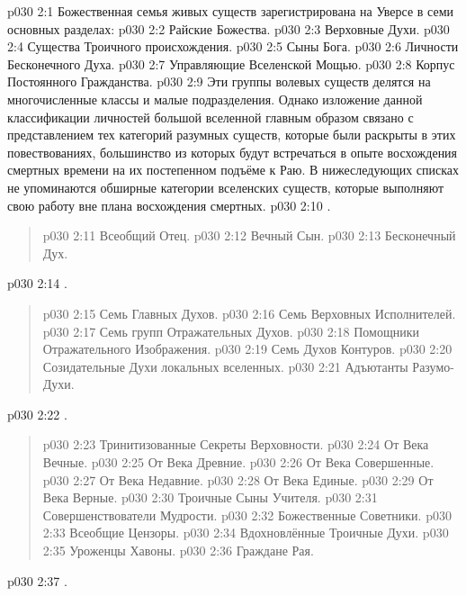 \vs p030 2:1 Божественная семья живых существ зарегистрирована на Уверсе в семи основных разделах:
\vs p030 2:2 Райские Божества.
\vs p030 2:3 Верховные Духи.
\vs p030 2:4 Существа Троичного происхождения.
\vs p030 2:5 Сыны Бога.
\vs p030 2:6 Личности Бесконечного Духа.
\vs p030 2:7 Управляющие Вселенской Мощью.
\vs p030 2:8 Корпус Постоянного Гражданства.
\vs p030 2:9 \pc Эти группы волевых существ делятся на многочисленные классы и малые подразделения. Однако изложение данной классификации личностей большой вселенной главным образом связано с представлением тех категорий разумных существ, которые были раскрыты в этих повествованиях, большинство из которых будут встречаться в опыте восхождения смертных времени на их постепенном подъёме к Раю. В нижеследующих списках не упоминаются обширные категории вселенских существ, которые выполняют свою работу вне плана восхождения смертных.
\vs p030 2:10 .
\begin{quote}
\vs p030 2:11 Всеобщий Отец.
\vs p030 2:12 Вечный Сын.
\vs p030 2:13 Бесконечный Дух.
\end{quote}
\vs p030 2:14 .
\begin{quote}
\vs p030 2:15 Семь Главных Духов.
\vs p030 2:16 Семь Верховных Исполнителей.
\vs p030 2:17 Семь групп Отражательных Духов.
\vs p030 2:18 Помощники Отражательного Изображения.
\vs p030 2:19 Семь Духов Контуров.
\vs p030 2:20 Созидательные Духи локальных вселенных.
\vs p030 2:21 Адъютанты Разумо\hyp{}Духи.
\end{quote}
\vs p030 2:22 .
\begin{quote}
\vs p030 2:23 Тринитизованные Секреты Верховности.
\vs p030 2:24 От Века Вечные.
\vs p030 2:25 От Века Древние.
\vs p030 2:26 От Века Совершенные.
\vs p030 2:27 От Века Недавние.
\vs p030 2:28 От Века Единые.
\vs p030 2:29 От Века Верные.
\vs p030 2:30 Троичные Сыны Учителя.
\vs p030 2:31 Совершенствователи Мудрости.
\vs p030 2:32 Божественные Советники.
\vs p030 2:33 Всеобщие Цензоры.
\vs p030 2:34 Вдохновлённые Троичные Духи.
\vs p030 2:35 Уроженцы Хавоны.
\vs p030 2:36 Граждане Рая.
\end{quote}
\vs p030 2:37 .
